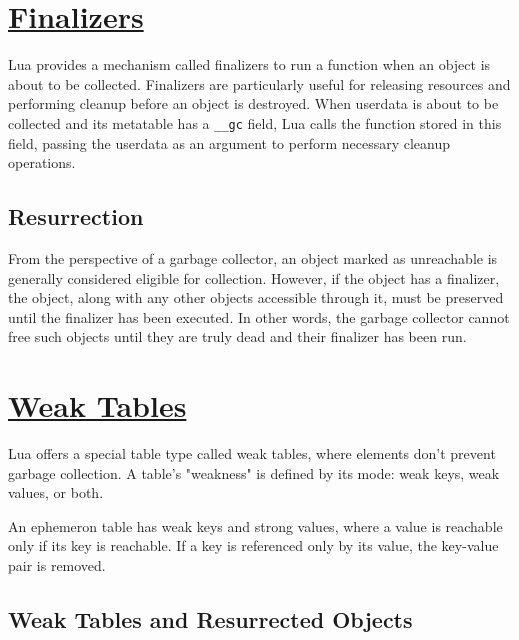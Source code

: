 \documentclass[10pt]{article}
\begin{document}
\vspace{-4ex} %
\begin{appendices}
\section{\href{https://www.lua.org/pil/29.html}{Finalizers}}\label{sec:finalizers}

Lua provides a mechanism called finalizers to run a function when an object is about to be collected. Finalizers are particularly useful for releasing resources and performing cleanup before an object is destroyed. When userdata is about to be collected and its metatable has a \texttt{\_\_gc} field, Lua calls the function stored in this field, passing the userdata as an argument to perform necessary cleanup operations.

\subsection{Resurrection} \label{sec:resurrection}

From the perspective of a garbage collector, an object marked as unreachable is generally considered eligible for collection. However, if the object has a finalizer, the object, along with any other objects accessible through it, must be preserved until the finalizer has been executed. In other words, the garbage collector cannot free such objects until they are truly dead and their finalizer has been run.

\section{\href{https://www.lua.org/pil/17.html}{Weak Tables}} \label{sec:weak_tables}

Lua offers a special table type called weak tables, where elements don't prevent garbage collection. A table's "weakness" is defined by its mode: weak keys, weak values, or both.

An ephemeron table has weak keys and strong values, where a value is reachable only if its key is reachable. If a key is referenced only by its value, the key-value pair is removed.

\subsection{Weak Tables and Resurrected Objects} \label{sec:resurrected_objects}


\end{appendices}
\end{document}
